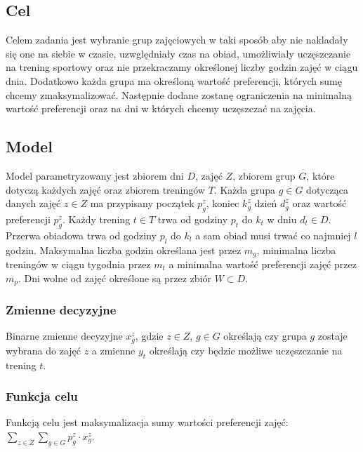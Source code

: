 \documentclass{article}
\begin{document}
\subsection{Cel}
Celem zadania jest wybranie grup zajęciowych w taki sposób aby nie nakladały się one na siebie w czasie, uzwględniały czas na obiad, umożliwiały uczęszczanie na trening sportowy oraz nie przekraczamy określonej liczby godzin zajęć w ciągu dnia.
Dodatkowo każda grupa ma określoną wartość preferencji, których sumę chcemy zmaksymalizować. Następnie dodane zostanę ograniczenia na minimalną wartość preferencji oraz na dni w których chcemy uczęszczać na zajęcia.

\subsection{Model}
Model parametryzowany jest zbiorem dni $D$, zajęć $Z$, zbiorem grup $G$, które dotyczą każdych zajęć oraz zbiorem treningów $T$. Każda grupa $g \in G$ dotycząca danych zajęć $z \in Z$ ma przypisany początek $p^z_g$, koniec $k^z_g$ dzień $d^z_g$ oraz wartość preferencji $p^z_g$. 
Każdy trening $t \in T$ trwa od godziny $p_t$ do $k_t$ w dniu $d_t \in D$.
Przerwa obiadowa trwa od godziny $p_l$ do $k_l$ a sam obiad musi trwać co najmniej $l$ godzin.
Maksymalna liczba godzin określana jest przez $m_g$, minimalna liczba treningów w ciągu tygodnia przez $m_t$ a minimalna wartość preferencji zajęć przez $m_p$. Dni wolne od zajęć określone są przez zbiór $W \subset D$.

\subsubsection{Zmienne decyzyjne}
Binarne zmienne decyzyjne $x^z_g$, gdzie $z \in Z$, $g \in G$ określają czy grupa $g$ zostaje wybrana do zajęć $z$ a zmienne $y_t$ określają czy będzie możliwe uczęszczanie na trening $t$.

\subsubsection{Funkcja celu}
Funkcją celu jest maksymalizacja sumy wartości preferencji zajęć: $\displaystyle \sum_{z \in Z} \sum_{g \in G} p^z_g \cdot x^z_g$.
\end{document}
